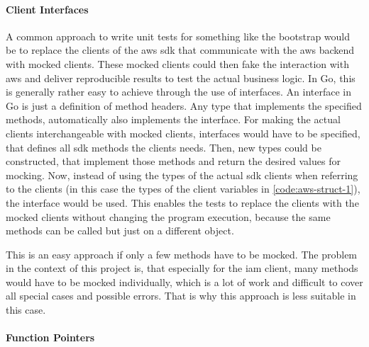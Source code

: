 \paragraph{Client Interfaces} A common approach to write unit tests for something like the bootstrap would be to replace the clients of the \ac{aws} \ac{sdk} that communicate with the \ac{aws} backend with mocked clients.
These mocked clients could then fake the interaction with \ac{aws} and deliver reproducible results to test the actual business logic.
In Go, this is generally rather easy to achieve through the use of interfaces.
An interface in Go is just a definition of method headers.
Any type that implements the specified methods, automatically also implements the interface.
For making the actual clients interchangeable with mocked clients, interfaces would have to be specified, that defines all \ac{sdk} methods the clients needs.
Then, new types could be constructed, that implement those methods and return the desired values for mocking.
Now, instead of using the types of the actual \ac{sdk} clients when referring to the clients (in this case the types of the client variables in \autoref{code:aws-struct-1}), the interface would be used.
This enables the tests to replace the clients with the mocked clients without changing the program execution, because the same methods can be called but just on a different object.

This is an easy approach if only a few methods have to be mocked.
The problem in the context of this project is, that especially for the \ac{iam} client, many methods would have to be mocked individually, which is a lot of work and difficult to cover all special cases and possible errors.
That is why this approach is less suitable in this case.

\paragraph{Function Pointers}

